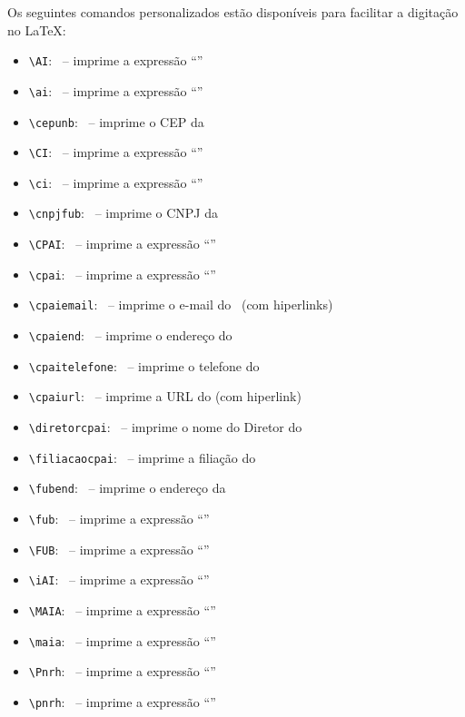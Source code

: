 
Os seguintes comandos personalizados estão disponíveis para facilitar a digitação no \LaTeX:

\begin{itemize}
 \item \verb|\AI|: \AI\ -- imprime a expressão ``\AI''
 \item \verb|\ai|: \ai\ -- imprime a expressão ``\ai''
 \item \verb|\cepunb|: \cepunb\ -- imprime o CEP da \unb 
 \item \verb|\CI|: \CI\ -- imprime a expressão ``\CI''
 \item \verb|\ci|: \ci\ -- imprime a expressão ``\ci''
 \item \verb|\cnpjfub|: \cnpjfub\ -- imprime o CNPJ da \fub
 \item \verb|\CPAI|: \CPAI\ -- imprime a expressão ``\CPAI''
 \item \verb|\cpai|: \cpai\ -- imprime a expressão ``\cpai''
 \item \verb|\cpaiemail|: \cpaiemail\ -- imprime o e-mail do \cpai\ (com hiperlinks)
 \item \verb|\cpaiend|: \cpaiend\ -- imprime o endereço do \cpai 
 \item \verb|\cpaitelefone|: \cpaitelefone\ -- imprime o telefone do \cpai 
 \item \verb|\cpaiurl|: \cpaiurl\ -- imprime a URL do \cpai (com hiperlink)
 \item \verb|\diretorcpai|: \diretorcpai\ -- imprime o nome do Diretor do \cpai 
 \item \verb|\filiacaocpai|: \filiacaocpai\ -- imprime a filiação do \cpai 
 \item \verb|\fubend|: \fubend\ -- imprime o endereço da \fub 
 \item \verb|\fub|: \fub\ -- imprime a expressão ``\fub''
 \item \verb|\FUB|: \FUB\  -- imprime a expressão ``\FUB''
 \item \verb|\iAI|: \iAI\  -- imprime a expressão ``\iAI''
 \item \verb|\MAIA|: \MAIA\ -- imprime a expressão ``\MAIA''
 \item \verb|\maia|: \maia\  -- imprime a expressão ``\maia''
 \item \verb|\Pnrh|: \Pnrh\  -- imprime a expressão ``\Pnrh''
 \item \verb|\pnrh|: \pnrh\  -- imprime a expressão ``\pnrh''

\end{itemize}
